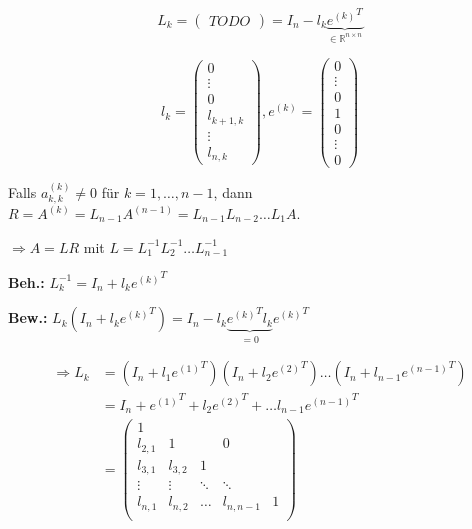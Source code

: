 \documentclass[a4paper,10pt]{article}
\newtheorem[L]{satz}{Satz}[section]
\newtheorem[S]{beweis}{Beweis}
\newtheorem[S]{beh}{Behauptung}
\begin{document}
\[
  L_k = \begin{pmatrix}
    TODO
  \end{pmatrix}
  = I_n - l_k \underbrace{{{e^{(k)}}^T}}_{\in \mathbb{R}^{n \times n}}
\]

\[
  l_k = \begin{pmatrix}
          0 \\ \vdots \\ 0 \\ l_{k+1,k} \\ \vdots \\ l_{n,k}
        \end{pmatrix},
  e^{(k)} = \begin{pmatrix} 0 \\ \vdots \\ 0 \\ 1 \\ 0 \\ \vdots \\ 0 \end{pmatrix} %
\]

Falls $a_{k,k}^{(k)} \neq 0$ für $k=1, \dots, n-1$, dann $R = A^{(k)} = L_{n-1} A^{(n-1)} = L_{n-1} L_{n-2} \dots L_{1} A$.

$\Rightarrow A = LR$ mit $L=L_1^{-1} L_2^{-1} \dots L_{n-1}^{-1}$

\textbf{Beh.:} $L_k^{-1} = I_n + l_k {e^{(k)}}^T$

\textbf{Bew.:} $L_k (I_n + l_k {e^{(k)}}^T) = I_n - l_k \underbrace{{e^{(k)}}^T l_k}_{=0} {e^{(k)}}^T$

\begin{align*}
  \Rightarrow L_k &= (I_n + l_1 {e^{(1)}}^T) (I_n + l_2 {e^{(2)}}^T) \dots (I_n + l_{n-1} {e^{(n-1)}}^T) \\
                  &= I_n + {e^{(1)}}^T + l_2 {e^{(2)}}^T + \dots l_{n-1} {e^{(n-1)}}^T \\
                  &= \begin{pmatrix}
                       1 \\
                       l_{2,1} & 1 & & 0 \\
                       l_{3,1} & l_{3,2} & 1 \\
                       \vdots & \vdots & \ddots & \ddots \\
                       l_{n,1} & l_{n,2} & \dots & l_{n,n-1} & 1 \\
                     \end{pmatrix} \\
\end{align*}
\end{document}
